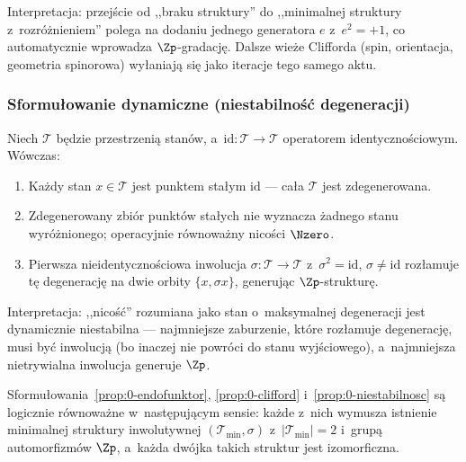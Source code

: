 Interpretacja: przej\'scie od ,,braku struktury'' do ,,minimalnej
struktury z~rozr\'o\.znieniem'' polega na dodaniu jednego generatora
$e$ z~$e^2 = +1$, co automatycznie wprowadza $\Zp$-gradacj\k{e}.
Dalsze wie\.ze Clifforda (spin, orientacja, geometria spinorowa)
wy\l{}aniaj\k{a} si\k{e} jako iteracje tego samego aktu.

\subsubsection{Sformu\l{}owanie dynamiczne (niestabilność degeneracji)}%
\label{app:0-dynamiczne}

\begin{proposition}%
\label{prop:0-niestabilnosc}
Niech $\mathcal{T}$ b\k{e}dzie przestrzeni\k{a} stan\'ow, a~$\mathrm{id}:
\mathcal{T} \to \mathcal{T}$ operatorem identyczno\'sciowym. W\'owczas:
\begin{enumerate}[label=(\roman*), nosep]
  \item Ka\.zdy stan $x \in \mathcal{T}$ jest punktem sta\l{}ym
    $\mathrm{id}$ --- ca\l{}a $\mathcal{T}$ jest zdegenerowana.
  \item Zdegenerowany zbi\'or punkt\'ow sta\l{}ych nie wyznacza
    \.zadnego stanu wyr\'o\.znionego; operacyjnie r\'ownowa\.zny
    nicości $\Nzero$.
  \item Pierwsza nieidentyczno\'sciowa inwolucja $\sigma: \mathcal{T}
    \to \mathcal{T}$ z~$\sigma^2 = \mathrm{id}$, $\sigma \neq \mathrm{id}$
    roz\l{}amuje t\k{e} degeneracj\k{e} na dwie orbity $\{x, \sigma x\}$,
    generuj\k{a}c $\Zp$-strukturę.
\end{enumerate}
\end{proposition}

Interpretacja: ,,nicość'' rozumiana jako stan o~maksymalnej
degeneracji jest dynamicznie niestabilna --- najmniejsze zaburzenie,
kt\'ore roz\l{}amuje degeneracj\k{e}, musi by\'c inwolucj\k{a}
(bo inaczej nie powr\'oci do stanu wyj\'sciowego), a~najmniejsza
nietrywialna inwolucja generuje $\Zp$.

\begin{theorem}%
\label{thm:0-rownowaznosc}
Sformu\l{}owania~\ref{prop:0-endofunktor},
\ref{prop:0-clifford} i~\ref{prop:0-niestabilnosc} s\k{a}
logicznie r\'ownowa\.zne w~nast\k{e}puj\k{a}cym sensie: ka\.zde z~nich
wymusza istnienie minimalnej struktury inwolutywnej
$(\mathcal{T}_{\min}, \sigma)$ z~$|\mathcal{T}_{\min}| = 2$ i~grup\k{a}
automorfizm\'ow $\Zp$, a~ka\.zda dw\'ojka takich struktur jest
izomorficzna.
\end{theorem}

